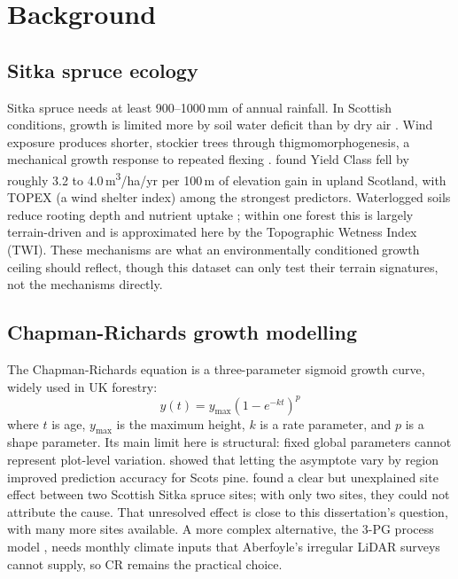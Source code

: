 \chapter{Background}
\label{ch:background}

\section{Sitka spruce ecology}

Sitka spruce needs at least 900--1000\,mm of annual rainfall. In Scottish conditions, growth is limited more by soil water deficit than by dry air \citep{morison2010UnderstandingGrowthSitka}. Wind exposure produces shorter, stockier trees through thigmomorphogenesis, a mechanical growth response to repeated flexing \citep{telewski2006UnifiedHypothesisMechanoperception}. \citet{worrell1987PredictingProductivitySitka} found Yield Class fell by roughly 3.2 to 4.0\,m\textsuperscript{3}/ha/yr per 100\,m of elevation gain in upland Scotland, with TOPEX (a wind shelter index) among the strongest predictors. Waterlogged soils reduce rooting depth and nutrient uptake \citep{forestresearch2026SitkaSpruce}; within one forest this is largely terrain-driven and is approximated here by the Topographic Wetness Index (TWI). These mechanisms are what an environmentally conditioned growth ceiling should reflect, though this dataset can only test their terrain signatures, not the mechanisms directly.

\section{Chapman-Richards growth modelling}

The Chapman-Richards equation \citep{pienaar1973ChapmanRichardsGeneralization} is a three-parameter sigmoid growth curve, widely used in UK forestry:
\[
y(t) = y_{\max} \left(1 - e^{-kt}\right)^{p}
\]
where $t$ is age, $y_{\max}$ is the maximum height, $k$ is a rate parameter, and $p$ is a shape parameter. Its main limit here is structural: fixed global parameters cannot represent plot-level variation. \citet{socha2021RegionalHeightGrowth} showed that letting the asymptote vary by region improved prediction accuracy for Scots pine. \citet{manso2022DiameterHeightVolume} found a clear but unexplained site effect between two Scottish Sitka spruce sites; with only two sites, they could not attribute the cause. That unresolved effect is close to this dissertation's question, with many more sites available. A more complex alternative, the 3-PG process model \citep{landsberg1997GeneralisedModelForest}, needs monthly climate inputs that Aberfoyle's irregular LiDAR surveys cannot supply, so CR remains the practical choice.

